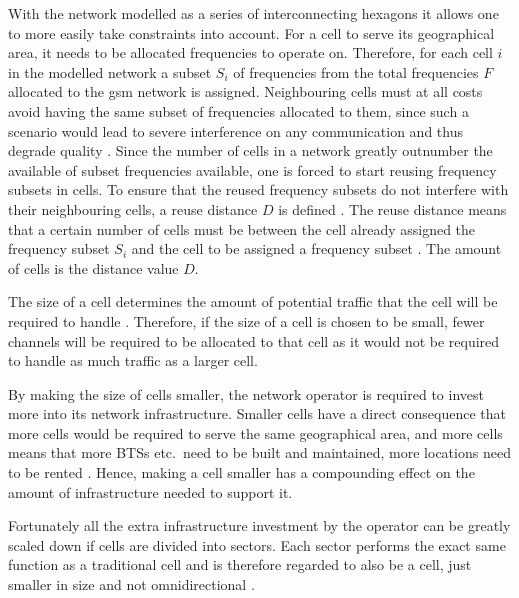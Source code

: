 With the network modelled as a series of interconnecting hexagons it allows one to more easily take constraints into account. For a cell to serve its geographical area, it needs to be allocated frequencies to operate on. Therefore, for each cell $i$ in the modelled network a subset $S_i$ of frequencies from the total frequencies $F$ allocated to the \gls{gsm} network is assigned\cite{GSMArchitectureProtocolsServices}. Neighbouring cells must at all costs avoid having the same subset of frequencies allocated to them, since such a scenario would lead to severe interference on any communication and thus degrade quality \cite{GSMArchitectureProtocolsServices}.
Since the number of cells in a network greatly outnumber the available of subset frequencies available, one is forced to start reusing frequency subsets in cells. To ensure that the reused frequency subsets do not interfere with their neighbouring cells, a reuse distance $D$ is defined \cite{GSMArchitectureProtocolsServices}. The reuse distance means that a certain number of cells must be between the cell already assigned the frequency subset $S_i$ and the cell to be assigned a frequency subset \cite{GSMArchitectureProtocolsServices}. The amount of cells is the distance value $D$.

The size of a cell determines the amount of potential traffic that the cell will be required to handle \cite{GSM92,Eisenblatter,GSMArchitectureProtocolsServices}. Therefore, if the size of a cell is chosen to be small, fewer channels will be required to be allocated to that cell as it would not be required to handle as much traffic as a larger cell. 

By making the size of cells smaller, the network operator is required to invest more into its network infrastructure. Smaller cells have a direct consequence that more cells would be required to serve the same geographical area, and more cells means that more BTSs etc.\ need to be built and maintained, more locations need to be rented \cite{GSMArchitectureProtocolsServices}. Hence, making a cell smaller has a compounding effect on the amount of infrastructure needed to support it.

Fortunately all the extra infrastructure investment by the operator can be greatly scaled down if cells are divided into sectors\label{def:cellsector}. Each sector performs the exact same function as a traditional cell and is therefore regarded to also be a cell, just smaller in size and not omnidirectional \cite{GSMArchitectureProtocolsServices,GSM92,GSMSysEngin}. 

